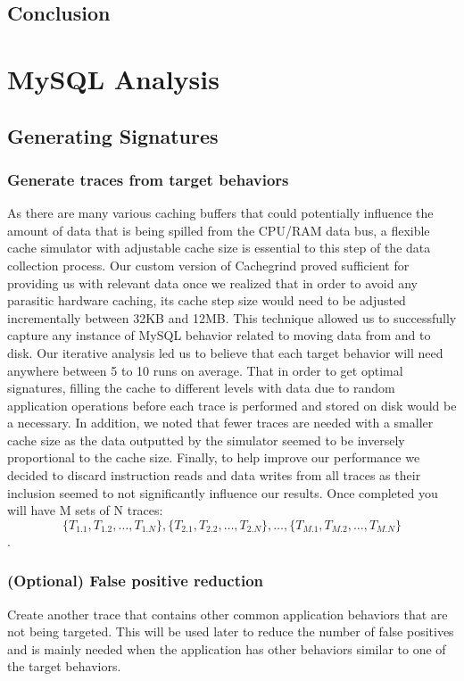 \documentclass[11pt, oneside]{article}
\begin{document}
\subsection{Conclusion}

\section{MySQL Analysis}

\subsection{Generating Signatures}
\subsubsection{Generate traces from target behaviors}
As there are many various caching buffers that could potentially influence the 
amount of data that is being spilled from the CPU/RAM data bus, a flexible 
cache simulator with adjustable cache size is essential to this step of the 
data collection process. Our custom version of Cachegrind proved sufficient 
for providing us with relevant data once we realized that in order to avoid 
any parasitic hardware caching, its cache step size would need to be adjusted 
incrementally between 32KB and 12MB. This technique allowed us to successfully 
capture any instance of MySQL behavior related to moving data from and to 
disk.  Our iterative analysis led us to believe that each target behavior will 
need anywhere between 5 to 10 runs on average. That in order to get optimal 
signatures, filling the cache to different levels with data due to random 
application operations before each trace is performed and stored on disk would 
be a necessary. In addition, we noted that fewer traces are needed with a 
smaller cache size as the data outputted by the simulator seemed to be 
inversely proportional to the cache size. Finally, to help improve our 
performance we decided to discard instruction reads and data writes from all 
traces as their inclusion seemed to not significantly influence our results.
Once completed you will have M sets of N traces:
$$\{T_{1.1}, T_{1.2}, \ldots, T_{1.N}\}, 
  \{T_{2.1}, T_{2.2}, \ldots, T_{2.N}\},
  \ldots,
  \{T_{M.1}, T_{M.2}, \ldots, T_{M.N}\}$$.

\subsubsection{(Optional) False positive reduction}
Create another trace that contains other common application behaviors that are 
not being targeted. This will be used later to reduce the number of false 
positives and is mainly needed when the application has other behaviors 
similar to one of the target behaviors.
\end{document}
